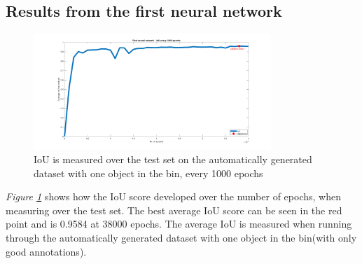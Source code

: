 \subsection{Results from the first neural network} \label{sec:firstneural}
\begin{figure}[h]
 \centering
 \includegraphics[width=0.8\textwidth, trim={5cm 0 4cm 0},clip]{graphics/results/neuralnetworkauto.png}
 \caption{IoU is measured over the test set on the automatically generated dataset with one object in the bin, every 1000 epochs}
 \label{fig:neuralnetwork}
\end{figure}
\textit{Figure \ref{fig:neuralnetwork}} shows how the IoU score developed over the number of epochs, when measuring over the test set. The best average IoU score can be seen in the red point and is 0.9584 at 38000 epochs. The average IoU is measured when running through the automatically generated dataset with one object in the bin(with only good annotations).

